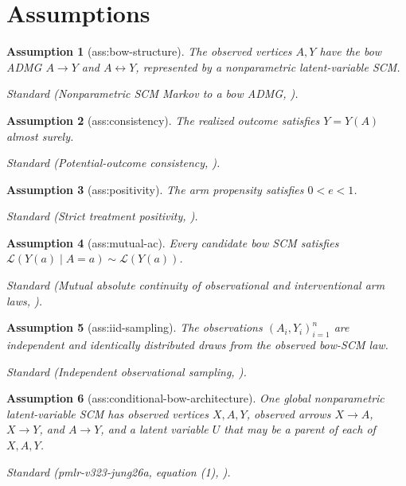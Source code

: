 \documentclass{article}
\newtheorem{assumption}{Assumption}
\begin{document}
\section{Assumptions}

\begin{assumption}[ass:bow-structure]\label{ass:bow-structure}
The observed vertices \(A,Y\) have the bow ADMG \(A\to Y\) and \(A\leftrightarrow Y\), represented by a nonparametric latent-variable SCM.
\par\smallskip\noindent\emph{Standard} (Nonparametric SCM Markov to a bow ADMG, \cite{Pearl2009}).
\end{assumption}

\begin{assumption}[ass:consistency]\label{ass:consistency}
The realized outcome satisfies \(Y=Y(A)\) almost surely.
\par\smallskip\noindent\emph{Standard} (Potential-outcome consistency, \cite{Pearl2009}).
\end{assumption}

\begin{assumption}[ass:positivity]\label{ass:positivity}
The arm propensity satisfies \(0<e<1\).
\par\smallskip\noindent\emph{Standard} (Strict treatment positivity, \cite{pmlr-v323-jung26a}).
\end{assumption}

\begin{assumption}[ass:mutual-ac]\label{ass:mutual-ac}
Every candidate bow SCM satisfies \(\mathcal L(Y(a)\mid A=a)\sim\mathcal L(Y(a))\).
\par\smallskip\noindent\emph{Standard} (Mutual absolute continuity of observational and interventional arm laws, \cite{pmlr-v323-jung26a}).
\end{assumption}

\begin{assumption}[ass:iid-sampling]\label{ass:iid-sampling}
The observations \((A_i,Y_i)_{i=1}^n\) are independent and identically distributed draws from the observed bow-SCM law.
\par\smallskip\noindent\emph{Standard} (Independent observational sampling, \cite{vanDerVaartWellner1996}).
\end{assumption}

\begin{assumption}[ass:conditional-bow-architecture]\label{ass:conditional-bow-architecture}
One global nonparametric latent-variable SCM has observed vertices \(X,A,Y\), observed arrows \(X\to A\), \(X\to Y\), and \(A\to Y\), and a latent variable \(U\) that may be a parent of each of \(X,A,Y\).
\par\smallskip\noindent\emph{Standard} (pmlr-v323-jung26a, equation (1), \cite{pmlr-v323-jung26a}).
\end{assumption}
\end{document}
